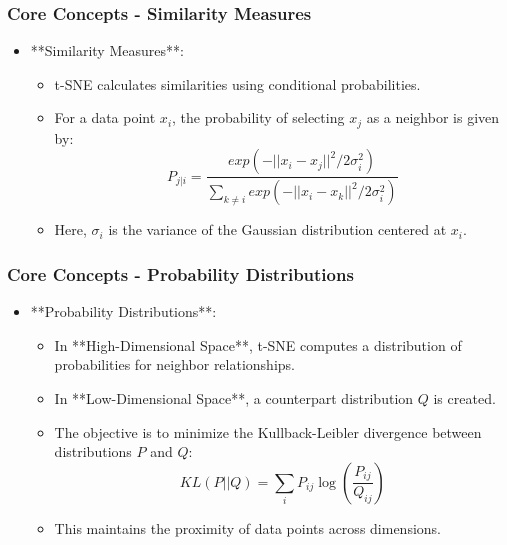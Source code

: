 \documentclass[aspectratio=169]{beamer}
\begin{document}
\begin{frame}[fragile]
    \frametitle{Core Concepts - Similarity Measures}
    \begin{itemize}
        \item **Similarity Measures**: 
        \begin{itemize}
            \item t-SNE calculates similarities using conditional probabilities.
            \item For a data point \(x_i\), the probability of selecting \(x_j\) as a neighbor is given by:
            \begin{equation}
                P_{j|i} = \frac{exp(-||x_i - x_j||^2 / 2\sigma_i^2)}{\sum_{k \neq i} exp(-||x_i - x_k||^2 / 2\sigma_i^2)}
            \end{equation}
            \item Here, \(\sigma_i\) is the variance of the Gaussian distribution centered at \(x_i\).
        \end{itemize}
    \end{itemize}
\end{frame}

\begin{frame}[fragile]
    \frametitle{Core Concepts - Probability Distributions}
    \begin{itemize}
        \item **Probability Distributions**:
        \begin{itemize}
            \item In **High-Dimensional Space**, t-SNE computes a distribution of probabilities for neighbor relationships.
            \item In **Low-Dimensional Space**, a counterpart distribution \(Q\) is created. 
            \item The objective is to minimize the Kullback-Leibler divergence between distributions \(P\) and \(Q\):
            \begin{equation}
                KL(P || Q) = \sum_{i} P_{ij} \log \left( \frac{P_{ij}}{Q_{ij}} \right)
            \end{equation}
            \item This maintains the proximity of data points across dimensions.
        \end{itemize}
    \end{itemize}
\end{frame}
\end{document}
